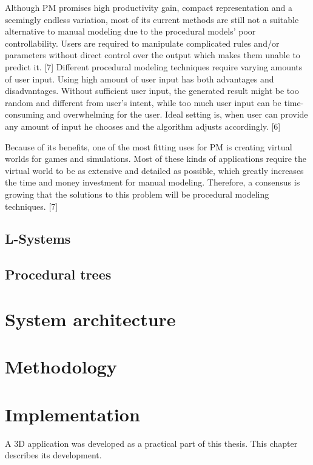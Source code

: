 \documentclass[
  digital, %
  table,   %
  nolof,     %
  nolot,     %
]{fithesis3}
\begin{document}
Although PM promises high productivity gain, compact representation and a seemingly endless variation, most of its current methods are still not a suitable alternative to manual modeling due to the procedural models’ poor controllability. Users are required to manipulate complicated rules and/or parameters without direct control over the output which makes them unable to predict it. [7]
Different procedural modeling techniques require varying amounts of user input. Using high amount of user input has both advantages and disadvantages. Without sufficient user input, the generated result might be too random and different from user’s intent, while too much user input can be time-consuming and overwhelming for the user. Ideal setting is, when user can provide any amount of input he chooses and the algorithm adjusts accordingly. [6]\par
Because of its benefits, one of the most fitting uses for PM is creating virtual worlds for games and simulations. Most of these kinds of applications require the virtual world to be as extensive and detailed as possible, which greatly increases the time and money investment for manual modeling. Therefore, a consensus is growing that the solutions to this problem will be procedural modeling techniques. [7]
\section{L-Systems}
\section{Procedural trees}
\chapter{System architecture}
\chapter{Methodology}
\chapter{Implementation}
A 3D application was developed as a practical part of this thesis. This chapter describes its development.
\end{document}
